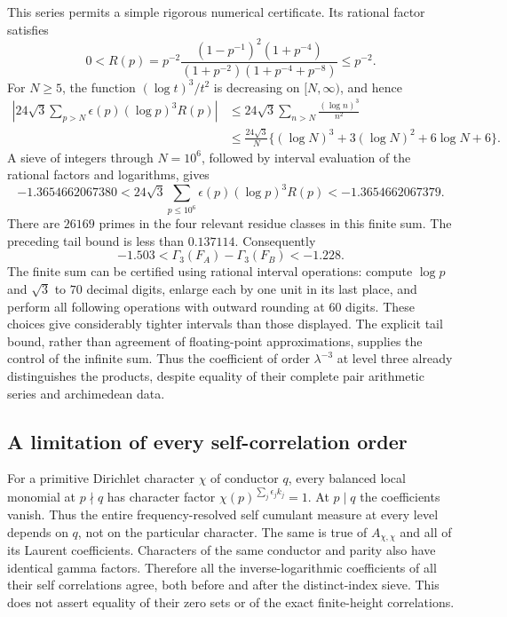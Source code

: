 \documentclass[11pt]{article}
\numberwithin{equation}{section}
\theoremstyle{remark}
\begin{document}
This series permits a simple rigorous numerical certificate.  Its
rational factor satisfies
\[
 0<R(p)=p^{-2}
 \frac{(1-p^{-1})^2(1+p^{-4})}
      {(1+p^{-2})(1+p^{-4}+p^{-8})}\le p^{-2}.
\]
For $N\ge5$, the function $(\log t)^3/t^2$ is decreasing on $[N,\infty)$,
and hence
\begin{align*}
 \left|24\sqrt3\sum_{p>N}\epsilon(p)(\log p)^3R(p)\right|
 &\le24\sqrt3\sum_{n>N}\frac{(\log n)^3}{n^2}\\
 &\le\frac{24\sqrt3}{N}
   \{(\log N)^3+3(\log N)^2+6\log N+6\}.
\end{align*}
A sieve of integers through $N=10^6$, followed by interval evaluation of
the rational factors and logarithms, gives
\[
 -1.3654662067380
 <24\sqrt3\sum_{p\le10^6}\epsilon(p)(\log p)^3R(p)
 <-1.3654662067379.
\]
There are $26169$ primes in the four relevant residue classes in this
finite sum.  The preceding tail bound is less than $0.137114$.
Consequently
\[
 \boxed{-1.503<\Gamma_3(F_A)-\Gamma_3(F_B)<-1.228.}
\]
The finite sum can be certified using rational interval operations:
compute $\log p$ and $\sqrt3$ to $70$ decimal digits, enlarge each by
one unit in its last place, and perform all following operations with
outward rounding at $60$ digits.  These choices give considerably tighter
intervals than those displayed.  The explicit tail bound, rather than
agreement of floating-point approximations, supplies the control of the
infinite sum.  Thus the coefficient of order $\lambda^{-3}$ at level
three already distinguishes the products, despite equality of their
complete pair arithmetic series and archimedean data.


\subsection{A limitation of every self-correlation order}
For a primitive Dirichlet character $\chi$ of conductor $q$, every
balanced local monomial at $p\nmid q$ has character factor
$\chi(p)^{\sum_j\epsilon_jk_j}=1$. At $p\mid q$ the coefficients
vanish. Thus the entire frequency-resolved self cumulant measure at
every level depends on $q$, not on the particular character. The same
is true of $A_{\chi,\chi}$ and all of its Laurent coefficients.
Characters of the same conductor and parity also have identical gamma
factors. Therefore all the inverse-logarithmic coefficients of all their
self correlations agree, both before and after the distinct-index
sieve. This does not assert equality of their zero sets or of the exact
finite-height correlations.
\end{document}
